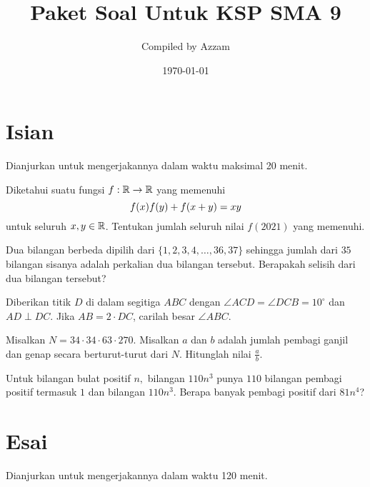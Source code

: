 \documentclass[11pt]{scrartcl}
\begin{document}
	\title{Paket Soal Untuk KSP SMA 9} %
	\date{\today}
	\author{Compiled by Azzam}
	\maketitle
	
	\section{Isian}
	Dianjurkan untuk mengerjakannya dalam waktu maksimal 20 menit.
	
	\begin{soalbaru}
		Diketahui suatu fungsi $f:\mathbb R \to \mathbb R$ yang memenuhi 
		\vspace{-10pt}
		$$f(x)f(y)+f(x+y)=xy\\[-12pt]$$
		untuk seluruh $x,y \in \mathbb R$. Tentukan jumlah seluruh nilai $f(2021)$ yang memenuhi.
	\end{soalbaru}
	
	\begin{soalbaru}
	Dua bilangan berbeda dipilih dari $\{1,2,3,4,\dots,36,37\}$ sehingga jumlah dari $35$ bilangan sisanya adalah perkalian dua bilangan tersebut. Berapakah selisih dari dua bilangan tersebut?
	\end{soalbaru}
	
	\begin{soalbaru} 
			
			Diberikan titik $D$ di dalam segitiga $ABC$ dengan $\angle ACD = \angle DCB = 10^\circ$ dan $AD \perp DC$. Jika $AB = 2 \cdot DC$, carilah besar $\angle ABC$.
				\end{soalbaru}
	
		\begin{soalbaru}
		Misalkan $N=34\cdot34\cdot63\cdot270.$ Misalkan $a$ dan $b$ adalah jumlah pembagi ganjil dan genap secara berturut-turut dari $N$. Hitunglah nilai $\frac{a}{b}$.
		\end{soalbaru}
		
		\begin{soalbaru}
		Untuk bilangan bulat positif $n,$ bilangan $110n^3$ punya $110$ bilangan pembagi positif termasuk $1$ dan bilangan $110n^3.$ Berapa banyak pembagi positif dari $81n^4$?
		\end{soalbaru}
		
		
		\newpage
	\section{Esai}
	Dianjurkan untuk mengerjakannya dalam waktu 120 menit.
	
\end{document}
